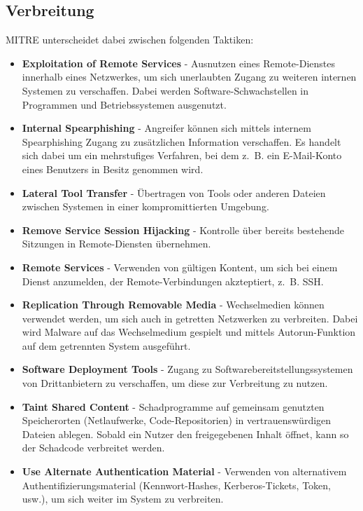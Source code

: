 \documentclass[conference]{IEEEtran}
\begin{document}
\subsection{Verbreitung}
MITRE \cite{MITRELateralMovement} unterscheidet dabei zwischen folgenden Taktiken:
\begin{itemize}
    \item \textbf{Exploitation of Remote Services} - Ausnutzen eines Remote-Dienstes innerhalb eines Netzwerkes, um sich unerlaubten Zugang zu weiteren internen Systemen zu verschaffen. Dabei werden Software-Schwachstellen in Programmen und Betriebssystemen ausgenutzt.
    \item \textbf{Internal Spearphishing} - Angreifer können sich mittels internem Spearphishing Zugang zu zusätzlichen Information verschaffen. Es handelt sich dabei um ein mehrstufiges Verfahren, bei dem z.~B. ein E-Mail-Konto eines Benutzers in Besitz genommen wird.
    \item \textbf{Lateral Tool Transfer} - Übertragen von Tools oder anderen Dateien zwischen Systemen in einer kompromittierten Umgebung.
    \item \textbf{Remove Service Session Hijacking} - Kontrolle über bereits bestehende Sitzungen in Remote-Diensten übernehmen.
    \item \textbf{Remote Services} - Verwenden von gültigen Kontent, um sich bei einem Dienst anzumelden, der Remote-Verbindungen akzteptiert, z.~B. SSH.
    \item \textbf{Replication Through Removable Media} - Wechselmedien können verwendet werden, um sich auch in getretten Netzwerken zu verbreiten. Dabei wird Malware auf das Wechselmedium gespielt und mittels Autorun-Funktion auf dem getrennten System ausgeführt.
    \item \textbf{Software Deployment Tools} - Zugang zu Softwarebereitstellungssystemen von Drittanbietern zu verschaffen, um diese zur Verbreitung zu nutzen.
    \item \textbf{Taint Shared Content} - Schadprogramme auf gemeinsam genutzten Speicherorten (Netlaufwerke, Code-Repositorien) in vertrauenswürdigen Dateien ablegen. Sobald ein Nutzer den freigegebenen Inhalt öffnet, kann so der Schadcode verbreitet werden.
    \item \textbf{Use Alternate Authentication Material} - Verwenden von alternativem Authentifizierungsmaterial (Kennwort-Hashes, Kerberos-Tickets, Token, usw.), um sich weiter im System zu verbreiten.
\end{itemize}
\end{document}
